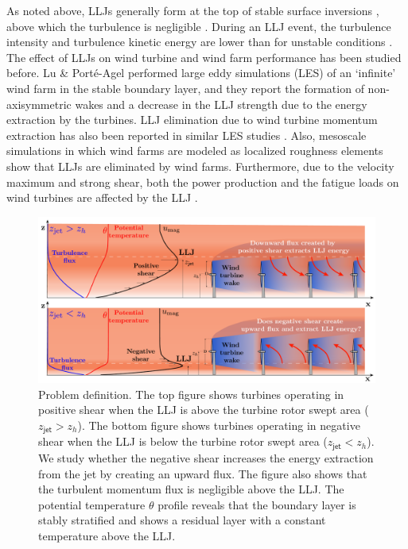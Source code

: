 \documentclass[%
 aip,
 amsmath,amssymb,
reprint,
twocolumn,%
author-numerical,%
]{revtex4-1}
\begin{document}
\indent As noted above, LLJs generally form at the top of stable surface inversions \cite{baa09}, above which the turbulence is negligible \cite{bla57}. {\color{black}During an LLJ event, the turbulence intensity and turbulence kinetic energy are lower than for unstable conditions \cite{gut16}.} The effect of LLJs on wind turbine and wind farm performance has been studied before. Lu \& Port{\'e}-Agel \cite{lu11} performed large eddy simulations (LES) of an `infinite' wind farm in the stable boundary layer, and they report the formation of non-axisymmetric wakes and a decrease in the LLJ strength due to the energy extraction by the turbines. {\color{black}LLJ elimination due to wind turbine momentum extraction has also been reported in similar LES studies \cite{abk16, bha15, sha17d, ali17}.} Also, mesoscale simulations in which wind farms are modeled as localized roughness elements show that LLJs are eliminated by wind farms\cite{fit13}. Furthermore, due to the velocity maximum and strong shear, both the power production and the fatigue loads on wind turbines are affected by the LLJ \cite{gut17}.\\
\begin{figure}
 \centering
 \includegraphics[width=0.9\linewidth]{fig1}
 \caption{{\color{black} Problem definition. The top figure shows turbines operating in positive shear when the LLJ is above the turbine rotor swept area ($z_\mathsf{jet} > z_h$). The bottom figure shows turbines operating in negative shear when the LLJ is below the turbine rotor swept area ($z_\mathsf{jet} < z_h$). We study whether the negative shear increases the energy extraction from the jet by creating an upward flux. The figure also shows that the turbulent momentum flux is negligible above the LLJ. The potential temperature $\theta$ profile reveals that the boundary layer is stably stratified and shows a residual layer with a constant temperature above the LLJ.}}
 \label{fig1}
\end{figure}
\end{document}
